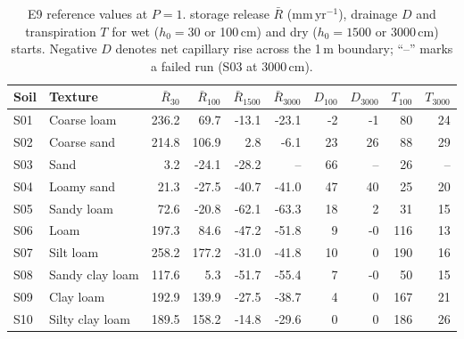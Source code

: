 \documentclass[preprint,12pt,authoryear]{elsarticle}
\begin{document}
\begin{table}[H]\centering\scriptsize
\caption{E9 reference values at $P=1$. storage release $\bar R$ (mm\,yr$^{-1}$), drainage $D$ and transpiration $T$ for wet ($h_0=30$ or 100\,cm) and dry ($h_0=1500$ or 3000\,cm) starts. Negative $D$ denotes net capillary rise across the 1\,m boundary; ``--'' marks a failed run (S03 at 3000\,cm).}
\label{tab:e9}
\begin{tabular}{llrrrrrrrr}
\toprule
Soil & Texture & $\bar R_{30}$ & $\bar R_{100}$ & $\bar R_{1500}$ & $\bar R_{3000}$ & $D_{100}$ & $D_{3000}$ & $T_{100}$ & $T_{3000}$\\\midrule
S01 & Coarse loam & 236.2 & 69.7 & -13.1 & -23.1 & -2 & -1 & 80 & 24\\
S02 & Coarse sand & 214.8 & 106.9 & 2.8 & -6.1 & 23 & 26 & 88 & 29\\
S03 & Sand & 3.2 & -24.1 & -28.2 & -- & 66 & -- & 26 & --\\
S04 & Loamy sand & 21.3 & -27.5 & -40.7 & -41.0 & 47 & 40 & 25 & 20\\
S05 & Sandy loam & 72.6 & -20.8 & -62.1 & -63.3 & 18 & 2 & 31 & 15\\
S06 & Loam & 197.3 & 84.6 & -47.2 & -51.8 & 9 & -0 & 116 & 13\\
S07 & Silt loam & 258.2 & 177.2 & -31.0 & -41.8 & 10 & 0 & 190 & 16\\
S08 & Sandy clay loam & 117.6 & 5.3 & -51.7 & -55.4 & 7 & -0 & 50 & 15\\
S09 & Clay loam & 192.9 & 139.9 & -27.5 & -38.7 & 4 & 0 & 167 & 21\\
S10 & Silty clay loam & 189.5 & 158.2 & -14.8 & -29.6 & 0 & 0 & 186 & 26\\
\bottomrule\end{tabular}\end{table}
\end{document}
